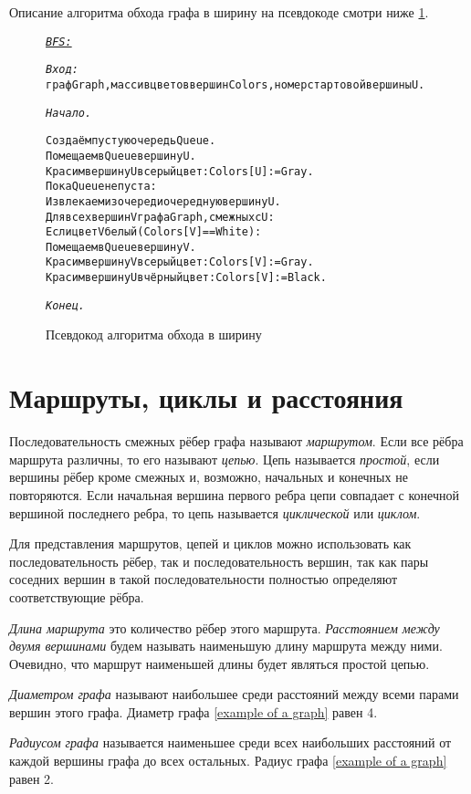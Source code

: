 Описание алгоритма обхода графа в ширину на псевдокоде смотри ниже \ref{bfs}.

\begin{figure}[h]
	\begin{alltt}
\textit{\underline{BFS:}}

\textit{Вход:}
  граф Graph, массив цветов вершин Colors, номер стартовой вершины U.

\textit{Начало.}

  Создаём пустую очередь Queue.
  Помещаем в Queue вершину U.
  Красим вершину U в серый цвет: Colors[U] := Gray.
  Пока Queue не пуста:
    Извлекаем из очереди очередную вершину U.
    Для всех вершин V графа Graph, смежных с U:
      Если цвет V белый (Colors[V] == White):
        Помещаем в Queue вершину V.
        Красим вершину V в серый цвет: Colors[V] := Gray.
      Красим вершину U в чёрный цвет: Colors[V] := Black.

\textit{Конец.}
	\end{alltt}
	\caption{Псевдокод алгоритма обхода в ширину}
	\label{bfs}
\end{figure}

\section{Маршруты, циклы и расстояния}

Последовательность смежных рёбер графа называют \emph{маршрутом}. Если все 
рёбра маршрута различны, то его называют \emph{цепью}. Цепь называется 
\emph{простой}, если вершины рёбер кроме смежных и, возможно, начальных и 
конечных не повторяются. Если начальная вершина первого ребра цепи совпадает с 
конечной вершиной последнего ребра, то цепь называется \emph{циклической} или 
\emph{циклом}.

Для представления маршрутов, цепей и циклов можно использовать как 
последовательность рёбер, так и последовательность вершин, так как пары 
соседних вершин в такой последовательности полностью определяют соответствующие 
рёбра.

\emph{Длина маршрута} это количество рёбер этого маршрута. \emph{Расстоянием 
между двумя вершинами} будем называть наименьшую длину маршрута между ними. 
Очевидно, что маршрут наименьшей длины будет являться простой цепью.

\emph{Диаметром графа} называют наибольшее среди расстояний между всеми парами 
вершин этого графа. Диаметр графа \ref{example of a graph} равен 4.

\emph{Радиусом графа} называется наименьшее среди всех наибольших расстояний от
каждой вершины графа до всех остальных. Радиус графа \ref{example of a graph} 
равен 2.

